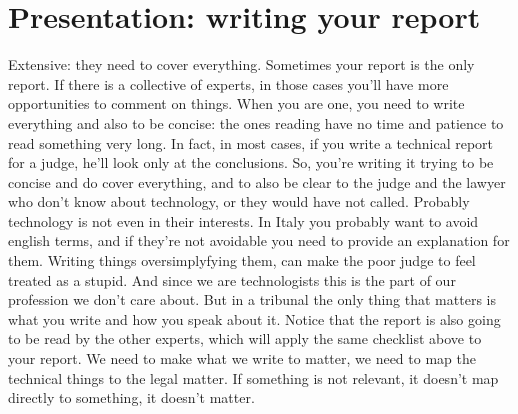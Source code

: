     \section{Presentation: writing your report}
        Extensive: they need to cover everything. Sometimes your report is the only report.
        If there is a collective of experts, in those cases you'll have more opportunities to comment on things. 
        When you are one, you need to write everything and also to be concise: the ones reading have no time and patience to read something very long.
        In fact, in most cases, if you write a technical report for a judge, he'll look only at the conclusions.
        So, you're writing it trying to be concise and do cover everything, and to also be clear to the judge and the lawyer who don't know about technology, or they would have not called.
        Probably technology is not even in their interests.
        In Italy you probably want to avoid english terms, and if they're not avoidable you need to provide an explanation for them.
        Writing things oversimplyfying them, can make the poor judge to feel treated as a stupid. And since we are technologists this is the part of our profession we don't care about. But in a tribunal the only thing that matters is what you write and how you speak about it.
        Notice that the report is also going to be read by the other experts, which will apply the same checklist above to your report.
        We need to make what we write to matter, we need to map the technical things to the legal matter.
        If something is not relevant, it doesn't map directly to something, it doesn't matter.
